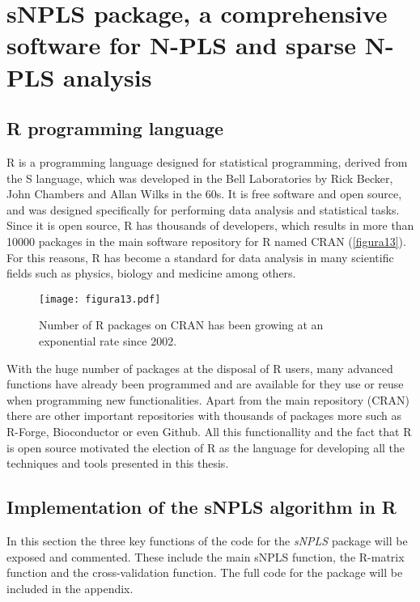 
\chapter[sNPLS package, a comprehensive software for N-PLS and sparse N-PLS analysis]{sNPLS package, a comprehensive software for N-PLS and sparse N-PLS analysis}



\section{R programming language}
R is a programming language designed for statistical programming, derived from the S language, which was developed in the Bell Laboratories by Rick Becker, John Chambers and Allan Wilks in the 60s. It is free software and open source, and was designed specifically for performing data analysis and statistical tasks. Since it is open source, R has thousands of developers, which results in more than 10000 packages in the main software repository for R named CRAN (\autoref{figura13}). For this reasons, R has become a standard for data analysis in many scientific fields such as physics, biology and medicine among others. 

\begin{figure}[hbtp]
	\centering
\texttt{[image: figura13.pdf]}
\caption{Number of R packages on CRAN has been growing at an exponential rate since 2002.}
\label{figura13}
\end{figure}

With the huge number of packages at the disposal of R users, many advanced functions have already been programmed and are available for they use or reuse when programming new functionalities. Apart from the main repository (CRAN) there are other important repositories with thousands of packages more such as R-Forge, Bioconductor or even Github. All this functionallity and the fact that R is open source motivated the election of R as the language for developing all the techniques and tools presented in this thesis.


\section{Implementation of the sNPLS algorithm in R}
In this section the three key functions of the code for the \textit{sNPLS} package will be exposed and commented. These include the main sNPLS function, the R-matrix function and the cross-validation function. The full code for the package will be included in the appendix.

